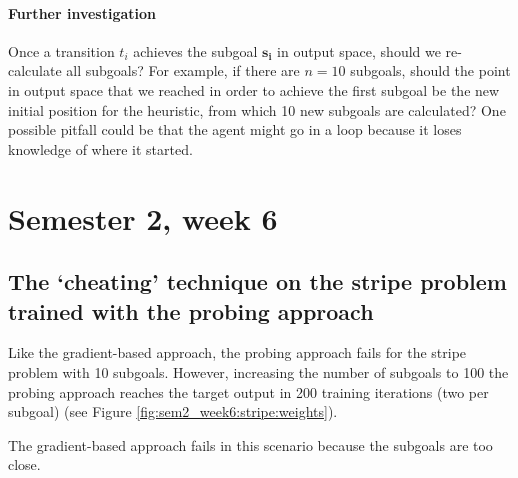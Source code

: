 \documentclass{article}
\renewcommand\vec{\mathbf}
\begin{document}
\paragraph{Further investigation}
Once a transition $t_i$ achieves the subgoal $\vec{s_i}$ in output space, should we re-calculate all subgoals?
For example, if there are $n=10$ subgoals, should the point in output space that we reached in order to achieve the first subgoal be the new initial position for the heuristic, from which 10 new subgoals are calculated?
One possible pitfall could be that the agent might go in a loop because it loses knowledge of where it started.   

\section{Semester 2, week 6}

\subsection{The `cheating' technique on the stripe problem trained with the probing approach}

Like the gradient-based approach, the probing approach fails for the stripe problem with 10 subgoals.
However, increasing the number of subgoals to 100 the probing approach reaches the target output in 200 training iterations (two per subgoal) (see Figure \ref{fig:sem2_week6:stripe:weights}). 

The gradient-based approach fails in this scenario because the subgoals are too close.
\end{document}
